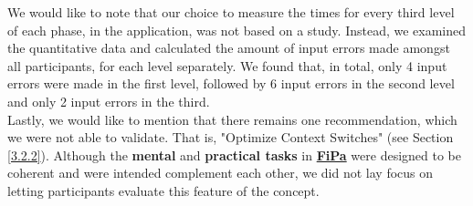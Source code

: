 We would like to note that our choice to measure the times for every third level of each phase, in the application, was not based on a study. Instead, we examined the quantitative data and calculated the amount of input errors made amongst all participants, for each level separately. We found that, in total, only 4 input errors were made in the first level, followed by 6 input errors in the second level and only 2 input errors in the third.\\

Lastly, we would like to mention that there remains one recommendation, which we were not able to validate. That is, "Optimize Context Switches" (see Section \ref{3.2.2}). Although the \textbf{mental} and \textbf{practical tasks} in \underline{\textbf{FiPa}} were designed to be coherent and were intended complement each other, we did not lay focus on letting participants evaluate this feature of the concept.
